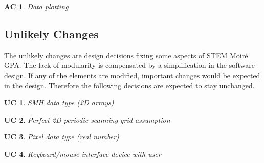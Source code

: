 \documentclass[12pt, titlepage]{article}
\newcommand{\progname}{STEM Moir{\'e} GPA}
\newcounter{acnum}
\newcommand{\actheacnum}{AC\theacnum}
\newtheorem{AC}{AC}
\newtheorem{UC}{UC}
\begin{document}
\begin{AC}\normalfont Data plotting
\label{AC_Plot}
\end{AC}

\subsection{Unlikely Changes} \label{SecUchange}

The unlikely changes are design decisions fixing some aspects of \progname{}. The lack of modularity is compensated by a simplification in the software design. If any of the elements are modified, important changes would be expected in the design. Therefore the following decisions are expected to stay unchanged.

\begin{UC}\normalfont SMH data type (2D arrays)
\label{UC_Input_data}
\end{UC}

\begin{UC}\normalfont Perfect 2D periodic scanning grid assumption
\label{UC_Assum_2DPeriodicGrid}
\end{UC}

\begin{UC}\normalfont Pixel data type (real number)
\label{UC_Assum_Pixel}
\end{UC}

\begin{UC}\normalfont Keyboard/mouse interface device with user
\label{UC_Assum_Pixel}
\end{UC}
\end{document}
